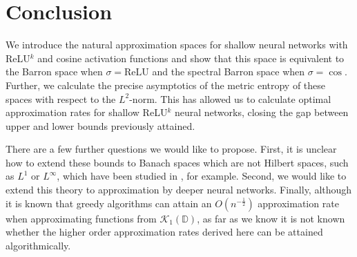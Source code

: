 \section{Conclusion}
We introduce the natural approximation spaces for shallow neural networks with ReLU$^k$  and cosine activation functions and show that this space is equivalent to the Barron space when $\sigma = \text{ReLU}$ and the spectral Barron space when $\sigma = \cos$. Further, we calculate the precise asymptotics of the metric entropy of these spaces with respect to the $L^2$-norm. This has allowed us to calculate optimal approximation rates for shallow ReLU$^k$ neural networks, closing the gap between upper and lower bounds previously attained. 

There are a few further questions we would like to propose. First, it is unclear how to extend these bounds to Banach spaces which are not Hilbert spaces, such as $L^1$ or $L^\infty$, which have been studied in \cite{klusowski2018approximation,makovoz1998uniform}, for example. Second, we would like to extend this theory to approximation by deeper neural networks. Finally, although it is known that greedy algorithms can attain an $O(n^{-\frac{1}{2}})$ approximation rate \cite{barron2008approximation} when approximating functions from $\mathcal{K}_1(\mathbb{D})$, as far as we know it is not known whether the higher order approximation rates derived here can be attained algorithmically.


